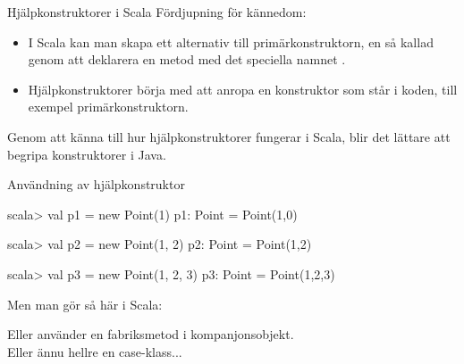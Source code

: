 \begin{Slide}{Hjälpkonstruktorer i Scala}%
Fördjupning för kännedom:
\begin{itemize}
\item I Scala kan man skapa ett alternativ till primärkonstruktorn, en så kallad   genom att deklarera en metod med det speciella namnet .


\item Hjälpkonstruktorer  börja med att anropa en  konstruktor som står  i koden, till exempel primärkonstruktorn.
\end{itemize}


{\SlideFontSmall Genom att känna till hur hjälpkonstruktorer fungerar i Scala, blir det lättare att begripa konstruktorer i Java.}

\end{Slide}

\begin{Slide}{Användning av hjälpkonstruktor}
\begin{REPL}
scala> val p1 = new Point(1)
p1: Point = Point(1,0)

scala> val p2 = new Point(1, 2)
p2: Point = Point(1,2)

scala> val p3 = new Point(1, 2, 3)
p3: Point = Point(1,2,3)
\end{REPL}

Men man gör  så här i Scala:
Eller använder en fabriksmetod i kompanjonsobjekt. \\
Eller ännu hellre en case-klass...
\end{Slide}



